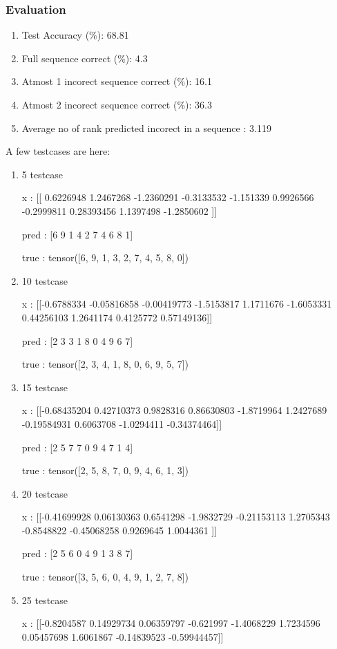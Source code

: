 \documentclass[journal,12pt,onecolumn]{IEEEtran}
\begin{document}
\subsubsection{Evaluation}
\begin{enumerate}
	\item Test Accuracy (\%): 68.81
	\item Full sequence correct (\%): 4.3
	\item Atmost 1 incorect sequence correct (\%): 16.1
	\item Atmost 2 incorect sequence correct (\%): 36.3
	\item Average no of rank predicted incorect in a sequence : 3.119
\end{enumerate}
A few testcases are here:
\begin{enumerate}
	\item 5 testcase

		x :  [[ 0.6226948   1.2467268  -1.2360291  -0.3133532  -1.151339    0.9926566
  -0.2999811   0.28393456  1.1397498  -1.2850602 ]]

		pred :  [6 9 1 4 2 7 4 6 8 1]

		true :  tensor([6, 9, 1, 3, 2, 7, 4, 5, 8, 0])
	\item 10 testcase

		x :  [[-0.6788334  -0.05816858 -0.00419773 -1.5153817   1.1711676  -1.6053331
   0.44256103  1.2641174   0.4125772   0.57149136]]

		pred :  [2 3 3 1 8 0 4 9 6 7]

		true :  tensor([2, 3, 4, 1, 8, 0, 6, 9, 5, 7])
	\item 15 testcase

		x :  [[-0.68435204  0.42710373  0.9828316   0.86630803 -1.8719964   1.2427689
  -0.19584931  0.6063708  -1.0294411  -0.34374464]]

		pred :  [2 5 7 7 0 9 4 7 1 4]

		true :  tensor([2, 5, 8, 7, 0, 9, 4, 6, 1, 3])
	\item 20 testcase

		x :  [[-0.41699928  0.06130363  0.6541298  -1.9832729  -0.21153113  1.2705343
  -0.8548822  -0.45068258  0.9269645   1.0044361 ]]

		pred :  [2 5 6 0 4 9 1 3 8 7]

		true :  tensor([3, 5, 6, 0, 4, 9, 1, 2, 7, 8])
	\item 25 testcase

		x :  [[-0.8204587   0.14929734  0.06359797 -0.621997   -1.4068229   1.7234596
   0.05457698  1.6061867  -0.14839523 -0.59944457]]


\end{enumerate}
\end{document}
